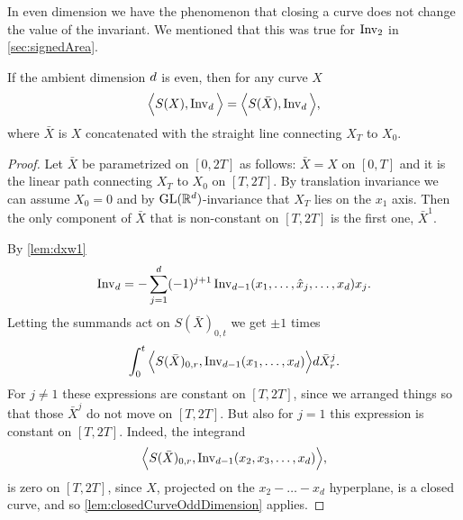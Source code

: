 In even dimension we have the phenomenon
that closing a curve does not change the value of the invariant. We mentioned that this was true for $\operatorname{Inv}_{2}$ in \autoref{sec:signedArea}.
\begin{lemma}
  \label{lem:lastPoint}
  If the ambient dimension $d$ is even, then for any curve $X$
  \begin{align*}
    \Big\langle S(X), \operatorname{Inv}_{d} \Big\rangle
    =
    \Big\langle S(\bar X), \operatorname{Inv}_{d} \Big\rangle,
  \end{align*}
  where $\bar X$ is $X$ concatenated with the straight line connecting $X_T$ to $X_0$.
\end{lemma}
\begin{proof}
  Let $\bar X$ be parametrized on $[0,2T]$ as follows: $\bar X = X$ on $[0,T]$
  and it is the linear path connecting $X_T$ to $X_0$ on $[T,2T]$.
  By translation invariance we can assume $X_0 = 0$ and by $\operatorname{GL}(\mathbb{R}^d)$-invariance that $X_T$ lies on the $x_1$ axis.
  Then the only component of $\bar X$ that is non-constant on $[T,2T]$ is the first one, $\bar X^1$.

  By \autoref{lem:dxw1}
  \begin{align*}
    \operatorname{Inv}_{d}
    =
    -
    \sum_{j=1}^d
    (-1)^{j+1}
    \operatorname{Inv}_{d-1}(x_1, \dots, \hat x_j, \dots, x_d) x_j.
  \end{align*}
  Letting the summands act on $S(\bar X)_{0,t}$ we get $\pm 1$ times
  \begin{align*}
    \int_0^t \Big\langle S(\bar X)_{0,r}, \operatorname{Inv}_{d-1}(x_1, \dots, x_d) \Big\rangle d\bar X^j_r.
  \end{align*}
  For $j\not=1$ these expressions are constant on $[T,2T]$, since we arranged things so that those
  $\bar X^j$ do not move on $[T,2T]$.
  But also for $j=1$ this expression is constant on $[T,2T]$.
  Indeed, the integrand 
  \begin{align*}
    \Big\langle S(\bar X)_{0,r}, \operatorname{Inv}_{d-1}(x_2, x_3, \dots, x_d) \Big\rangle,
  \end{align*}
  is zero on $[T,2T]$, since $X$, projected on the $x_2-\dots-x_d$ hyperplane, is a closed curve,
  and so \autoref{lem:closedCurveOddDimension} applies.
\end{proof}



